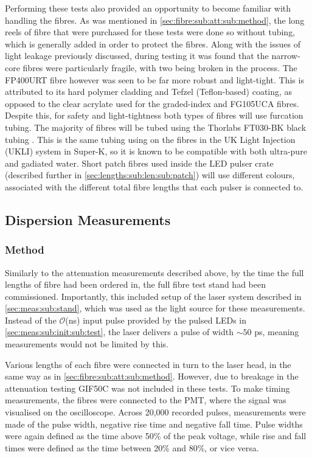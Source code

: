 \documentclass[a4paper,11pt]{article}
\let\oldsim\sim
\renewcommand{\sim}{{\oldsim}}
\begin{document}
Performing these tests also provided an opportunity to become familiar with handling the fibres. As was mentioned in \cref{sec:fibre:sub:att:sub:method}, the long reels of fibre that were purchased for these tests were done so without tubing, which is generally added in order to protect the fibres. Along with the issues of light leakage previously discussed, during testing it was found that the narrow-core fibres were particularly fragile, with two being broken in the process. The FP400URT fibre however was seen to be far more robust and light-tight. This is attributed to its hard polymer cladding and Tefzel (Teflon-based) coating, as opposed to the clear acrylate used for the graded-index and FG105UCA fibres. Despite this, for safety and light-tightness both types of fibres will use furcation tubing. The majority of fibres will be tubed using the Thorlabs FT030-BK black tubing \cite{bib:ft030bk}. This is the same tubing using on the fibres in the UK Light Injection (UKLI) system in Super-K, so it is known to be compatible with both ultra-pure and gadiated water. Short patch fibres used inside the LED pulser crate (described further in \cref{sec:lengths:sub:len:sub:patch}) will use different colours, associated with the different total fibre lengths that each pulser is connected to.

\subsection{Dispersion Measurements}

\subsubsection{Method}

Similarly to the attenuation measurements described above, by the time the full lengths of fibre had been ordered in, the full fibre test stand had been commissioned. Importantly, this included setup of the laser system described in \cref{sec:meas:sub:stand}, which was used as the light source for these measurements. Instead of the $\mathcal{O}$(ns) input pulse provided by the pulsed LEDs in \cref{sec:meas:sub:init:sub:test}, the laser delivers a pulse of width $\sim50$ ps, meaning measurements would not be limited by this.

Various lengths of each fibre were connected in turn to the laser head, in the same way as in \cref{sec:fibre:sub:att:sub:method}. However, due to breakage in the attenuation testing GIF50C was not included in these tests. To make timing measurements, the fibres were connected to the PMT, where the signal was visualised on the oscilloscope. Across 20,000 recorded pulses, measurements were made of the pulse width, negative rise time and negative fall time. Pulse widths were again defined as the time above 50\% of the peak voltage, while rise and fall times were defined as the time between 20\% and 80\%, or vice versa.
\end{document}
